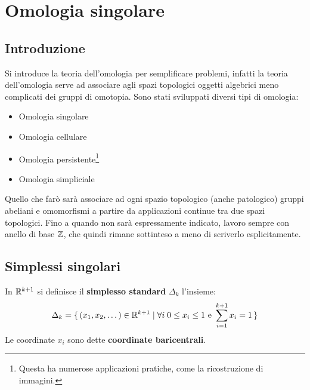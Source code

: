 \chapter{Omologia singolare}

\section{Introduzione}

Si introduce la teoria dell'omologia per semplificare problemi, infatti la
teoria dell'omologia serve ad associare agli spazi topologici oggetti
algebrici meno complicati dei gruppi di omotopia. Sono stati sviluppati diversi
tipi di omologia:
\begin{itemize}
\item Omologia singolare
\item Omologia cellulare
\item Omologia persistente\footnote{Questa ha numerose applicazioni pratiche, come la ricostruzione di immagini.}
\item Omologia simpliciale
\end{itemize}
Quello che farò sarà associare ad ogni spazio topologico (anche patologico)
gruppi abeliani e omomorfismi a partire da applicazioni continue tra due spazi
topologici. Fino a quando non sarà espressamente indicato, lavoro sempre con
anello di base $ \mathbb{Z} $, che quindi rimane sottinteso a meno di scriverlo
esplicitamente.

\section{Simplessi singolari}

\begin{definition}
  In $ \mathbb{R}^{k+1} $ si definisce il \textbf{simplesso standard} $ \Delta_k $ l'insieme:
  \[
    \Delta_k = \set{(x_1,x_2,\dots) \in \mathbb{R}^{k+1} | \forall i \; 0 \leq x_i \leq 1 \text{ e } \sum_{i=1}^{k+1}x_i = 1}
  \]
  Le coordinate $ x_i $ sono dette \textbf{coordinate baricentrali}.
\end{definition}

